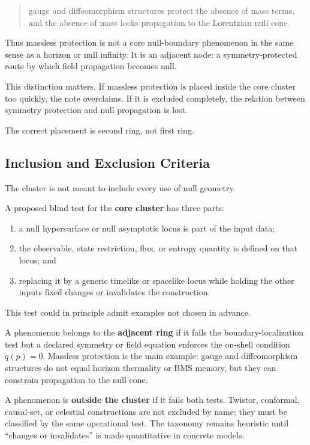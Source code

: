 \documentclass[12pt,a4paper]{article}
\theoremstyle{definition}
\theoremstyle{remark}
\newcommand{\tightlist}{%
  \setlength{\itemsep}{0pt}\setlength{\parskip}{0pt}}
\begin{document}
\begin{quote}
gauge and diffeomorphism structures protect the absence of mass terms,
and the absence of mass locks propagation to the Lorentzian null cone.
\end{quote}

Thus massless protection is not a core null-boundary phenomenon in the
same sense as a horizon or null infinity. It is an adjacent node: a
symmetry-protected route by which field propagation becomes null.

This distinction matters. If massless protection is placed inside the
core cluster too quickly, the note overclaims. If it is excluded
completely, the relation between symmetry protection and null
propagation is lost.

The correct placement is second ring, not first ring.

\subsection{Inclusion and Exclusion
Criteria}\label{inclusion-and-exclusion-criteria}

The cluster is not meant to include every use of null geometry.

A proposed blind test for the \textbf{core cluster} has three parts:
\begin{enumerate}[leftmargin=*]
\tightlist
\item a null hypersurface or null asymptotic locus is part of the input data;
\item the observable, state restriction, flux, or entropy quantity is defined on that locus; and
\item replacing it by a generic timelike or spacelike locus while holding the other inputs fixed changes or invalidates the construction.
\end{enumerate}
This test could in principle admit examples not chosen in advance.

A phenomenon belongs to the \textbf{adjacent ring} if it fails the boundary-localization test but a declared symmetry or field equation enforces the on-shell condition $q(p)=0$. Massless protection is the main example: gauge and diffeomorphism structures do not equal horizon thermality or BMS memory, but they can constrain propagation to the null cone.

A phenomenon is \textbf{outside the cluster} if it fails both tests.  Twistor, conformal, causal-set, or celestial constructions are not excluded by name; they must be classified by the same operational test.  The taxonomy remains heuristic until ``changes or invalidates'' is made quantitative in concrete models.
\end{document}
